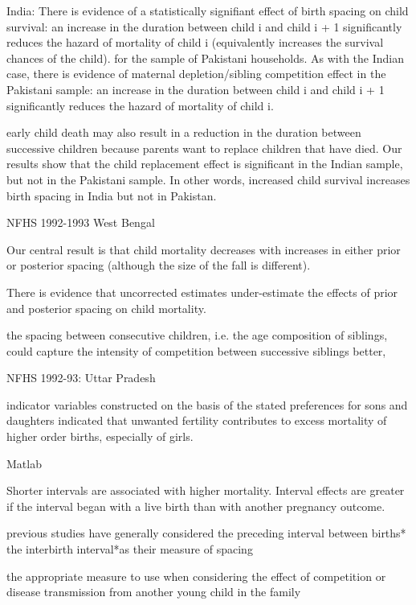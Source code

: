India: There is evidence of a statistically signifiant effect of birth
spacing on child survival: an increase in the duration between child i
and child i + 1 significantly reduces the hazard of mortality of child i
(equivalently increases the survival chances of the child).
for the sample of Pakistani households. As with the Indian case, there
is evidence of maternal depletion/sibling competition effect in the
Pakistani sample: an increase in the duration between child i and child
i + 1 significantly reduces the hazard of mortality of child i.

early child death may also result in a reduction in the duration between
successive children because parents want to replace children that have
died.
Our results show that the child replacement effect is signiﬁcant in the
Indian sample, but not in the Pakistani sample. In other words,
increased child survival increases birth spacing in India but not in
Pakistan. 

\citep{Makepeace2008}

NFHS 1992-1993 West Bengal

Our central result is that child mortality decreases with increases in
either prior or posterior spacing (although the size of the fall is
different).

There is evidence that uncorrected estimates under-estimate the effects
of prior and posterior spacing on child mortality.

the spacing between consecutive children, i.e. the age composition of
siblings, could capture the intensity of competition between successive
siblings better,

\citep{Bhargava2003}

NFHS 1992-93: Uttar Pradesh

indicator variables constructed on the basis of the stated preferences
for sons and daughters indicated that unwanted fertility contributes to
excess mortality of higher order births, especially of girls.

\citep{Davanzo2008}

Matlab

Shorter intervals are associated with higher mortality. Interval effects
are greater if the
interval began with a live birth than with another pregnancy outcome.

previous studies have generally considered the preceding interval
between births* the interbirth interval*as their measure of spacing

the appropriate measure to use when considering the effect of
competition or disease transmission from another young child in the
family

